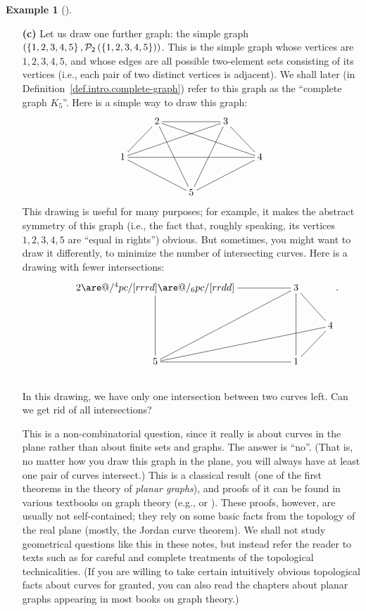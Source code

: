 \documentclass[numbers=enddot,12pt,final,onecolumn,notitlepage]{scrartcl}%
\makeatletter
\theoremstyle{definition}
\newtheorem{exam}[theo]{Example}
\newenvironment{example}[1][]
{\begin{exam}[#1]\begin{leftbar}}
{\end{leftbar}\end{exam}}
\newcommand{\powset}[2][]{\ifthenelse{\equal{#2}{}}{\mathcal{P}\left(#1\right)}{\mathcal{P}_{#1}\left(#2\right)}}
\newcommand{\set}[1]{\left\{ #1 \right\}}
\newcommand{\tup}[1]{\left( #1 \right)}
\newcommand{\are}{\ar@{-}}
\makeatother
\begin{document}
\begin{example}
\begin{enumerate}
\item[\textbf{(c)}] Let us draw one further graph: the simple graph
$\tup{\set{1, 2, 3, 4, 5}, \powset[2]{\set{1, 2, 3, 4, 5}}}$. This is
the simple graph whose vertices are $1, 2, 3, 4, 5$, and whose edges
are all possible two-element sets consisting of its vertices (i.e.,
each pair of two distinct vertices is adjacent). We shall later (in
Definition~\ref{def.intro.complete-graph}) refer to this graph as
the ``complete graph $K_5$''. Here is a simple way to draw this graph:
\begin{align*}
\xymatrix{
& 2 \are[ld] \are[rr] \are[rrrd] \are[rdd] & & 3 \are[rd] \are[ldd] \are[llld] \\
1 \are[rrrr] \are[rrd] & & & & 4 \are[lld] \\
& & 5
}
\end{align*}
This drawing is useful for many purposes; for example, it makes the
abstract symmetry of this graph (i.e., the fact that, roughly
speaking, its vertices $1,2,3,4,5$ are ``equal in rights'') obvious.
But sometimes, you might want to draw it differently, to minimize the
number of intersecting curves. Here is a drawing with fewer
intersections:
\begin{align*}
\xymatrix{
& 2 \are[rr] \are@/^4pc/[rrrd] \are@/_6pc/[rrdd] \are[dd] & & 3 \are[rd] \are[lldd] \are[dd] \\
& & & & 4 \are[llld] \\
& 5 \are[rr] & & 1 \are[ru]
} . \\
\phantom{a} %
\end{align*}
In this drawing, we have only one intersection between two curves
left. Can we get rid of all intersections?

This is a non-combinatorial question, since it really is about curves
in the plane rather than about finite sets and graphs. The answer is
``no''. (That is, no matter how you draw this graph in the plane, you
will always have at least one pair of curves intersect.) This is a
classical result (one of the first theorems in the theory of
\textit{planar graphs}), and proofs of it can be found in various
textbooks on graph theory (e.g., \cite[Corollary 11.1(d)]{Harary69} or
\cite[Theorem 10.2]{BonMur08}). These proofs, however, are usually not
self-contained; they rely on some basic facts from the topology of the
real plane (mostly, the Jordan curve theorem). We shall not study
geometrical questions like this in these notes, but instead refer the
reader to texts such as \cite{FriFri98} for careful and complete
treatments of the topological technicalities.
(If you are willing to take certain intuitively obvious
topological facts about curves for granted, you can also read the
chapters about planar graphs appearing in most books on graph theory.)

\end{enumerate}

\end{example}
\end{document}
